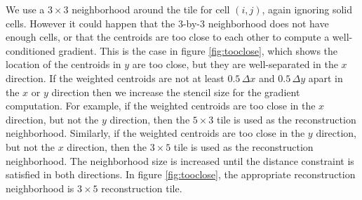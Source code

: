 \begin{enumerate}
We use a $3 \times 3$ neighborhood around the tile for cell $(i,j)$, again
ignoring solid cells.
However it could happen that the 3-by-3 neighborhood does not have enough cells,
or that the centroids are too close to each other to compute a 
well-conditioned gradient.
This is the case in figure \ref{fig:tooclose}, which shows the location of the
centroids in $y$ are too close, but they are well-separated 
in the  $x$ direction. 
If the weighted centroids are not at least $0.5\,\Delta x$  and $0.5\,\Delta y$ 
apart in the $x$ or $y$ direction then we increase the stencil size for the 
gradient computation.  For example, if the weighted centroids are too close in the $x$ 
direction, but not the $y$ direction, then the $5\times 3$ tile is used as the 
reconstruction neighborhood.  Similarly, if the weighted centroids are too 
close in the $y$ direction, but not the $x$ direction, then the $3\times 5$ tile is 
used as the reconstruction neighborhood.  The neighborhood size is increased until the 
distance constraint is satisfied in both directions.  In figure \ref{fig:tooclose},
the appropriate reconstruction neighborhood is $3\times 5$ reconstruction tile.


\end{enumerate}
